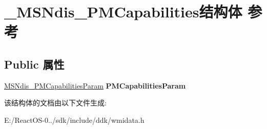 \hypertarget{struct___m_s_ndis___p_m_capabilities}{}\section{\+\_\+\+M\+S\+Ndis\+\_\+\+P\+M\+Capabilities结构体 参考}
\label{struct___m_s_ndis___p_m_capabilities}
\subsection*{Public 属性}
\begin{DoxyCompactItemize}
\item 
\mbox{\label{struct___m_s_ndis___p_m_capabilities_af411a9dd61b4d4b5534af3d0d1184b17}} 
\hyperlink{struct___m_s_ndis___p_m_capabilities_param}{M\+S\+Ndis\+\_\+\+P\+M\+Capabilities\+Param} {\bfseries P\+M\+Capabilities\+Param}
\end{DoxyCompactItemize}


该结构体的文档由以下文件生成\+:\begin{DoxyCompactItemize}
\item 
E\+:/\+React\+O\+S-\/0../sdk/include/ddk/wmidata.\+h\end{DoxyCompactItemize}
